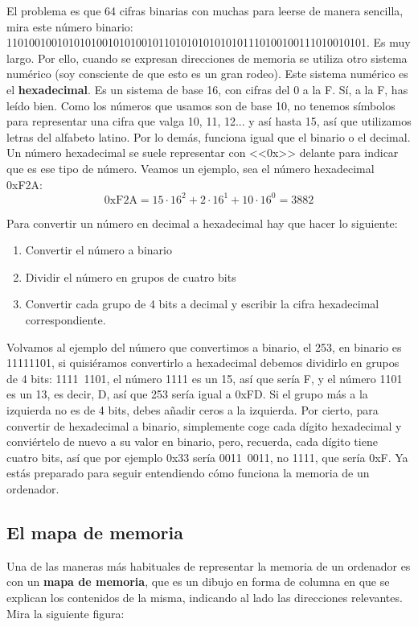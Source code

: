 \documentclass[a4paper]{article}
\begin{document}
El problema es que 64 cifras binarias con muchas para leerse de manera
sencilla, mira este número binario:
1101001001010101001010100101101010101010101110100100111010010101. Es muy
largo. Por ello, cuando se expresan direcciones de memoria se utiliza otro
sistema numérico (soy consciente de que esto es un gran rodeo). Este sistema
numérico es el \textbf{hexadecimal}. Es un sistema de base 16, con cifras del 0
a la F. Sí, a la F, has leído bien. Como los números que usamos son de base 10,
no tenemos símbolos para representar una cifra que valga 10, 11, 12... y así
hasta 15, así que utilizamos letras del alfabeto latino. Por lo demás, funciona
igual que el binario o el decimal. Un número hexadecimal se suele representar
con <<0x>> delante para indicar que es ese tipo de número. Veamos un ejemplo,
sea el número hexadecimal 0xF2A:
$$
\mathrm{0xF2A} = 15\cdot16^2 + 2\cdot16^1 + 10\cdot16^0 = 3882
$$

Para convertir un número en decimal a hexadecimal hay que hacer lo siguiente:
\begin{enumerate}
\item Convertir el número a binario
\item Dividir el número en grupos de cuatro bits
\item Convertir cada grupo de 4 bits a decimal y escribir la cifra hexadecimal
correspondiente.
\end{enumerate}

Volvamos al ejemplo del número que convertimos a binario, el 253, en binario
es 11111101, si quisiéramos convertirlo a hexadecimal debemos dividirlo
en grupos de 4 bits: 1111~1101, el número 1111 es un 15, así que sería F,
y el número 1101 es un 13, es decir, D, así que 253 sería igual a
0xFD. Si el grupo más a la izquierda no es de 4 bits, debes
añadir ceros a la izquierda. Por cierto, para convertir de hexadecimal a
binario, simplemente coge cada dígito hexadecimal y conviértelo de nuevo a su
valor en binario, pero, recuerda, cada dígito tiene cuatro bits, así que por
ejemplo 0x33 sería 0011~0011, no 1111, que sería 0xF.
Ya estás preparado para seguir entendiendo cómo
funciona la memoria de un ordenador.

\subsection{El mapa de memoria}
Una de las maneras más habituales de representar la memoria de un ordenador
es con un \textbf{mapa de memoria}, que es un dibujo en forma de columna en
que se explican los contenidos de la misma, indicando al lado las direcciones
relevantes. Mira la siguiente figura:
\end{document}
